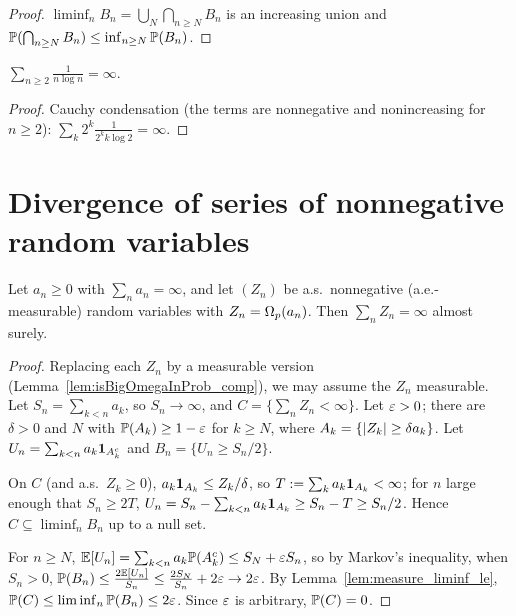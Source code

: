 \begin{proof}
  \leanok
  $\liminf_n B_n = \bigcup_N \bigcap_{n \ge N} B_n$ is an increasing union and
  $\mathbb{P}(\bigcap_{n \ge N} B_n) \le \inf_{n \ge N} \mathbb{P}(B_n)$.
\end{proof}

\begin{lemma}
  \label{lem:not_summable_inv_mul_log}
  \leanok
  $\sum_{n \ge 2} \frac{1}{n \log n} = \infty$.
\end{lemma}

\begin{proof}
  \leanok
  Cauchy condensation (the terms are nonnegative and nonincreasing for $n \ge 2$):
  $\sum_k 2^k \frac{1}{2^k k \log 2} = \infty$.
\end{proof}

\section{Divergence of series of nonnegative random variables}

\begin{lemma}
  \label{lem:ae_not_summable_of_isBigOmegaInProb}
  \leanok
  Let $a_n \ge 0$ with $\sum_n a_n = \infty$, and let $(Z_n)$ be a.s.\ nonnegative (a.e.-measurable)
  random variables with $Z_n = \Omega_p(a_n)$. Then $\sum_n Z_n = \infty$ almost surely.
\end{lemma}

\begin{proof}
  \leanok
  Replacing each $Z_n$ by a measurable version (Lemma~\ref{lem:isBigOmegaInProb_comp}), we may
  assume the $Z_n$ measurable. Let $S_n = \sum_{k<n} a_k$, so $S_n \to \infty$, and
  $C = \{\sum_n Z_n < \infty\}$. Let $\varepsilon > 0$; there are $\delta > 0$ and $N$ with
  $\mathbb{P}(A_k) \ge 1 - \varepsilon$ for $k \ge N$, where $A_k = \{\lvert Z_k \rvert \ge \delta a_k\}$. Let
  $U_n = \sum_{k<n} a_k \mathbf{1}_{A_k^c}$ and $B_n = \{U_n \ge S_n/2\}$.

  On $C$ (and a.s.\ $Z_k \ge 0$), $a_k \mathbf{1}_{A_k} \le Z_k/\delta$, so
  $T := \sum_k a_k \mathbf{1}_{A_k} < \infty$; for $n$ large enough that $S_n \ge 2T$,
  $U_n = S_n - \sum_{k<n} a_k \mathbf{1}_{A_k} \ge S_n - T \ge S_n/2$. Hence
  $C \subseteq \liminf_n B_n$ up to a null set.

  For $n \ge N$, $\mathbb{E}[U_n] = \sum_{k<n} a_k \mathbb{P}(A_k^c) \le S_N + \varepsilon S_n$, so by Markov's
  inequality, when $S_n > 0$,
  $\mathbb{P}(B_n) \le \frac{2 \mathbb{E}[U_n]}{S_n} \le \frac{2 S_N}{S_n} + 2\varepsilon \to 2 \varepsilon$. By
  Lemma~\ref{lem:measure_liminf_le}, $\mathbb{P}(C) \le \liminf_n \mathbb{P}(B_n) \le 2\varepsilon$. Since $\varepsilon$ is
  arbitrary, $\mathbb{P}(C) = 0$.
\end{proof}

